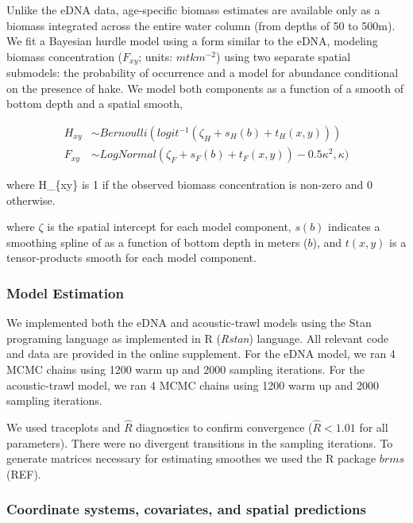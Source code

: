 \documentclass[
]{article}
\begin{document}
Unlike the eDNA data, age-specific biomass estimates are available only
as a biomass integrated across the entire water column (from depths of
50 to 500m). We fit a Bayesian hurdle model using a form similar to the
eDNA, modeling biomass concentration (\(F_{xy}\); units: \(mt km^{-2}\))
using two separate spatial submodels: the probability of occurrence and
a model for abundance conditional on the presence of hake. We model both
components as a function of a smooth of bottom depth and a spatial
smooth,

\begin{align}
  H_{xy} &\sim Bernoulli(logit^{-1}(\zeta_H + s_H(b) + t_H(x,y)))\\
  F_{xy} &\sim LogNormal(\zeta_F + s_F(b) + t_F(x,y)) - 0.5\kappa^2,\kappa)
\end{align}

where H\_\{xy\} is 1 if the observed biomass concentration is non-zero
and 0 otherwise.

where \(\zeta\) is the spatial intercept for each model component,
\(s(b)\) indicates a smoothing spline of as a function of bottom depth
in meters (\(b\)), and \(t(x,y)\) is a tensor-products smooth for each
model component.

\hypertarget{model-estimation}{%
\subsubsection{Model Estimation}\label{model-estimation}}

We implemented both the eDNA and acoustic-trawl models using the Stan
programing language as implemented in R (\emph{Rstan}) language. All
relevant code and data are provided in the online supplement. For the
eDNA model, we ran 4 MCMC chains using 1200 warm up and 2000 sampling
iterations. For the acoustic-trawl model, we ran 4 MCMC chains using
1200 warm up and 2000 sampling iterations.

We used traceplots and \(\hat{R}\) diagnostics to confirm convergence
(\(\hat{R} < 1.01\) for all parameters). There were no divergent
transitions in the sampling iterations. To generate matrices necessary
for estimating smoothes we used the R package \(brms\) (REF).

\hypertarget{coordinate-systems-covariates-and-spatial-predictions}{%
\subsubsection{Coordinate systems, covariates, and spatial
predictions}\label{coordinate-systems-covariates-and-spatial-predictions}}
\end{document}
